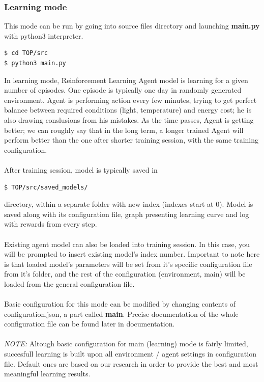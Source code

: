 \documentclass{article}
\begin{document}
\subsubsection{Learning mode}
This mode can be run by going into source files directory and launching \textbf{main.py}
 with python3 interpreter. 
\begin{lstlisting} 
$ cd TOP/src
$ python3 main.py
\end{lstlisting}
In learning mode, Reinforcement Learning Agent model is learning for a given number of episodes.
One episode is typically one day in randomly generated environment. Agent is performing action every few minutes, trying to get perfect balance between required conditions (light, temperature) and energy cost; he is also drawing conslusions from his mistakes. As the time passes, Agent is getting better; we can roughly say
that in the long term, a longer trained Agent will perform better than the one after shorter training session,
with the same training configuration.
\\\\
After training session, model is typically saved in
\begin{lstlisting}
$ TOP/src/saved_models/
\end{lstlisting}
directory, within a separate folder with new index (indexes start at 0). Model is saved along with its configuration file, graph presenting learning curve and log with rewards from every step.
\\\\
Existing agent model can also be loaded into training session. In this case, you will be prompted to insert existing model's index number. Important to note here is that loaded model's parameters will be set from it's specific configuration file from it's folder, and the rest of the configuration (environment, main) will be loaded from the general configuration file.
\\\\ 
Basic configuration for this mode can be modified by changing contents of configuration.json, a part called \textbf{main}. Precise documentation of the whole configuration file can be found later in documentation. 
\\\\
\textit{NOTE:} Altough basic configuration for main (learning) mode is fairly limited, succesfull learning is built upon all environment / agent settings in configuration file. Default ones are based on our research in order to provide the best and most meaningful learning results.
\end{document}
